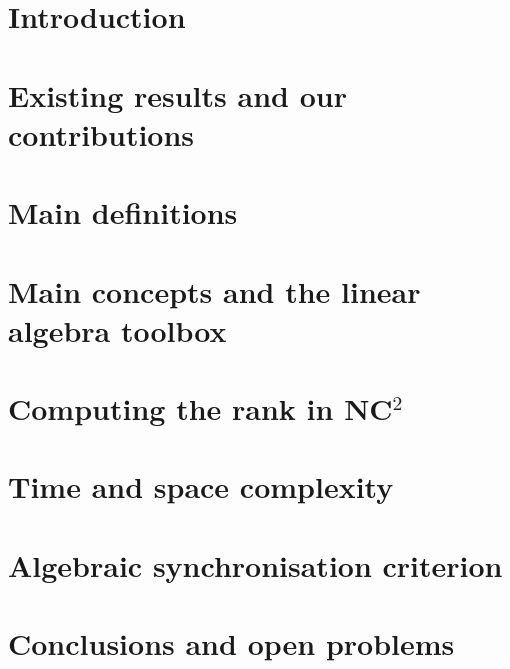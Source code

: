 \documentclass[UKenglish]{lmcs}
\newcommand{\NCT}{\textnormal{\textsf{NC$^2$}}\xspace}
\begin{document}
\maketitle

\section{Introduction}\label{sec-intro}



\section{Existing results and our contributions}\label{sec-existing}


\section{Main definitions}\label{sec-definitions}



\section{Main concepts and the linear algebra toolbox}\label{sec-toolbox}


\section{Computing the rank in \texorpdfstring{\NCT}{NC2}}\label{sec-nc2}



\section{Time and space complexity}\label{sec-time}



\section{Algebraic synchronisation criterion}\label{sec-algebraic}


\section{Conclusions and open problems}\label{sec-conclusions}




\end{document}
